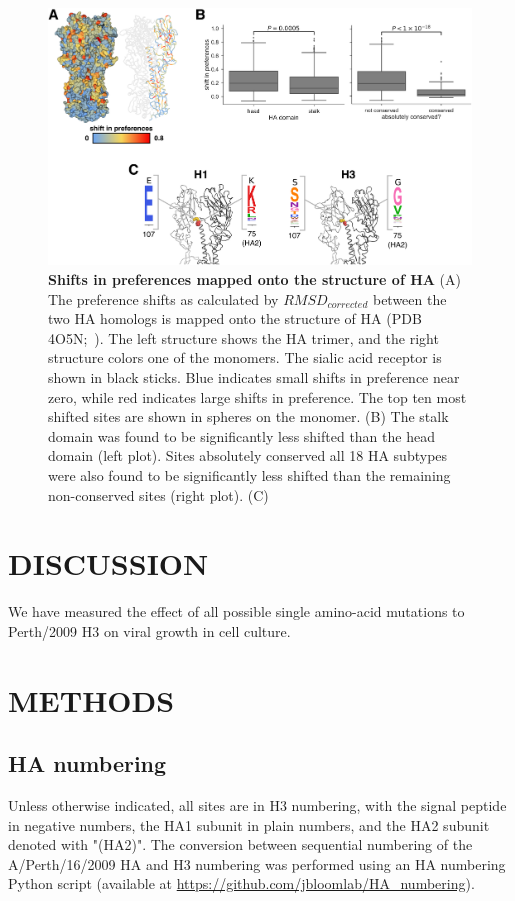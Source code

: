 \documentclass[11pt]{article}
\begin{document}
\begin{figure}
\centerline{\includegraphics[width=\textwidth]{figs/RMSD_heatmap/RMSD_heatmap.pdf}}
\caption{\label{fig:RMSD_heatmap}
{\bf Shifts in preferences mapped onto the structure of HA}
(A) The preference shifts as calculated by $RMSD_{corrected}$ between the two HA homologs is mapped onto the structure of HA (PDB 4O5N;~\cite{lee2014receptor}). 
The left structure shows the HA trimer, and the right structure colors one of the monomers. 
The sialic acid receptor is shown in black sticks.
Blue indicates small shifts in preference near zero, while red indicates large shifts in preference.
The top ten most shifted sites are shown in spheres on the monomer.
(B) The stalk domain was found to be significantly less shifted than the head domain (left plot).
Sites absolutely conserved all 18 HA subtypes were also found to be significantly less shifted than the remaining non-conserved sites (right plot).
(C) 
}
\end{figure}


\section*{DISCUSSION}
We have measured the effect of all possible single amino-acid mutations to Perth/2009 H3 on viral growth in cell culture.

\clearpage
\small

\section*{METHODS}
\label{sec:methods}
\subsection*{HA numbering}
Unless otherwise indicated, all sites are in H3 numbering, with the signal peptide in negative numbers, the HA1 subunit in plain numbers, and the HA2 subunit denoted with "(HA2)". The conversion between sequential numbering of the A/Perth/16/2009 HA and H3 numbering was performed using an HA numbering Python script (available at \url{https://github.com/jbloomlab/HA_numbering}).
\end{document}
